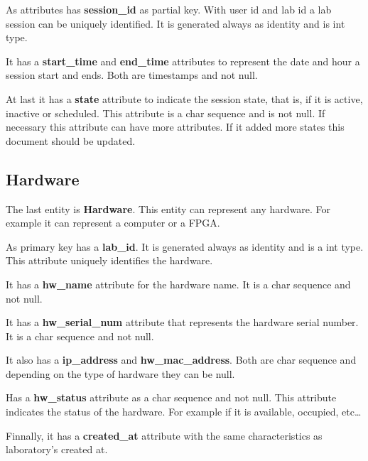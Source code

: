 \documentclass[a4paper,twoside,11pt]{article}
\begin{document}
As attributes has \textbf{session\_id} as partial key. With user id and lab id a lab session can be uniquely identified. It is generated always as identity and is int type.

It has a \textbf{start\_time} and \textbf{end\_time} attributes to represent the date and hour a session start and ends. Both are timestamps and not null.

At last it has a \textbf{state} attribute to indicate the session state, that is, if it is active, inactive or scheduled. This attribute is a char sequence and is not null. If necessary this attribute can have more attributes. If it added more states this document should be updated.

\subsection*{Hardware}
The last entity is \textbf{Hardware}. This entity can represent any hardware. For example it can represent a computer or a FPGA.

As primary key has a \textbf{lab\_id}. It is generated always as identity and is a int type. This attribute uniquely identifies the hardware.

It has a \textbf{hw\_name} attribute for the hardware name. It is a char sequence and not null. 

It has a \textbf{hw\_serial\_num} attribute that represents the hardware serial number. It is a char sequence and not null. 

It also has a \textbf{ip\_address} and \textbf{hw\_mac\_address}. Both are char sequence and depending on the type of hardware they can be null.

Has a \textbf{hw\_status} attribute as a char sequence and not null. This attribute indicates the status of the hardware. For example if it is available, occupied, etc\dots

Finnally, it has a \textbf{created\_at} attribute with the same characteristics as laboratory's created at.
\nocite{*}


\end{document}
